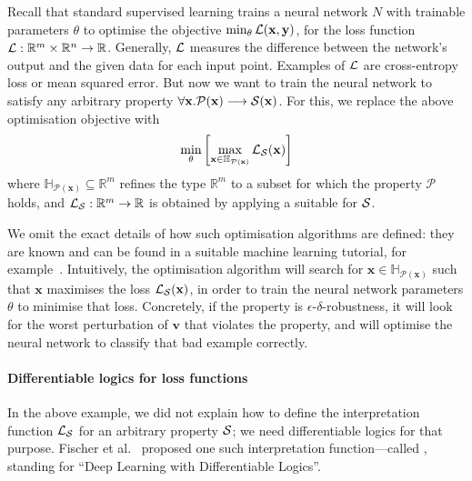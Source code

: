 \documentclass[a4paper,UKenglish,cleveref, autoref, thm-restate]{lipics-v2021}
\newcommand{\Real}{{\mathbb R}}
\newcommand{\Pp}{{\mathcal P}}
\newcommand{\Sp}{{\cal S}}
\newcommand{\losssymbol}{{\cal L}}
\newcommand{\lossfn}{\losssymbol}
\def\DLtwo{\textrm{DL2}}
\newcommand{\vect}[1]{\mathbf{#1}}
\newcommand{\x}{\vect{x}} %
\newcommand{\ve}{\vect{v}} %
\newcommand{\y}{\vect{y}} %
\begin{document}
\begin{example}   
Recall that standard supervised learning trains a neural network $N$ with trainable parameters $\theta$
to optimise the objective $ \min_{\theta} \lossfn(\x, \y)$,
for the loss function $\losssymbol: \Real^m \times \Real^n \rightarrow \Real$.
Generally, $\losssymbol$ measures the difference between 
the network's output and the given data for each input point. Examples of 
$\losssymbol$ are cross-entropy loss or mean squared error.
But now we want to train the neural network to satisfy any arbitrary property
$\forall \x. \Pp(\x) \longrightarrow \Sp(\x)$. For this,  
we replace the above optimisation objective  with
$$\min_{\theta} \left[\max_{\x \in \mathbb{H}_{\Pp(\x)}} \lossfn_{\Sp}(\x)\right]$$
where $ \mathbb{H}_{\Pp(\x)} \subseteq \Real^m$ refines the type $\Real^m$ to a subset for which the property $\Pp$ holds, 
  and $\lossfn_{\mathcal{S}}: \Real^m  \rightarrow \Real$ is obtained by applying a suitable
 for $\Sp$.

We omit the exact details of how such optimisation algorithms are
defined: they are known and can be found in a suitable machine
learning tutorial, for example~\cite{KM18}.
Intuitively, the optimisation algorithm will search for $\x \in \mathbb{H}_{\Pp(\x)}$ such that $\x$ 
maximises the loss $\lossfn_{\Sp}(\x)$, 
in order to train the neural network parameters $\theta$ to minimise that loss. 
Concretely, if the property is $\epsilon$-$\delta$-robustness, it will look for the worst perturbation of $\ve$
that violates the property, and will optimise the neural network to classify that bad example correctly. 
\end{example}

\paragraph*{Differentiable logics for loss functions}  In the above
example, we did not explain how to define the interpretation function
$\lossfn_{\Sp}$ for an arbitrary property $\Sp$; we need differentiable
logics for that purpose.
% 
Fischer et al.~\cite{fischer2019dl2} proposed one such interpretation
function---called \newterm{the differentiable logic \DLtwo{}},
standing for ``Deep Learning with Differentiable Logics''.

\end{document}
